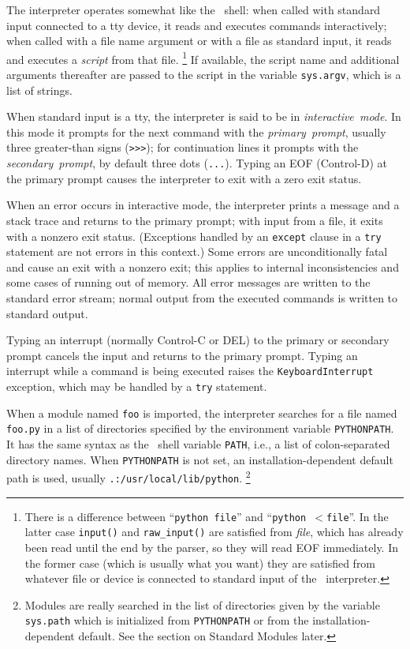 The interpreter operates somewhat like the \UNIX\ shell: when called with
standard input connected to a tty device, it reads and executes commands
interactively; when called with a file name argument or with a file as
standard input, it reads and executes a
{\em script}
from that file.%
\footnote{
	There is a difference between ``{\tt python file}'' and
	``{\tt python $<$file}''.  In the latter case {\tt input()} and
	{\tt raw\_input()} are satisfied from {\em file}, which has
	already been read until the end by the parser, so they will read
	EOF immediately.  In the former case (which is usually what
	you want) they are satisfied from whatever file or device is
	connected to standard input of the \Python\ interpreter.
}
If available, the script name and additional arguments thereafter are
passed to the script in the variable
{\tt sys.argv},
which is a list of strings.

When standard input is a tty, the interpreter is said to be in
{\em interactive\ mode}.
In this mode it prompts for the next command with the
{\em primary\ prompt},
usually three greater-than signs ({\tt >>>}); for continuation lines
it prompts with the
{\em secondary\ prompt},
by default three dots ({\tt ...}).
Typing an EOF (Control-D) at the primary prompt causes the interpreter
to exit with a zero exit status.

When an error occurs in interactive mode, the interpreter prints a
message and a stack trace and returns to the primary prompt; with input
from a file, it exits with a nonzero exit status.
(Exceptions handled by an
{\tt except}
clause in a
{\tt try}
statement are not errors in this context.)
Some errors are unconditionally fatal and cause an exit with a nonzero
exit; this applies to internal inconsistencies and some cases of running
out of memory.
All error messages are written to the standard error stream; normal
output from the executed commands is written to standard output.

Typing an interrupt (normally Control-C or DEL) to the primary or
secondary prompt cancels the input and returns to the primary prompt.
Typing an interrupt while a command is being executed raises the
{\tt KeyboardInterrupt}
exception, which may be handled by a
{\tt try}
statement.

When a module named
{\tt foo}
is imported, the interpreter searches for a file named
{\tt foo.py}
in a list of directories specified by the environment variable
{\tt PYTHONPATH}.
It has the same syntax as the \UNIX\ shell variable
{\tt PATH},
i.e., a list of colon-separated directory names.
When
{\tt PYTHONPATH}
is not set, an installation-dependent default path is used, usually
{\tt .:/usr/local/lib/python}.%
\footnote{
	Modules are really searched in the list of directories given by
	the variable {\tt sys.path} which is initialized from
	{\tt PYTHONPATH} or from the installation-dependent default.
	See the section on Standard Modules later.
}


